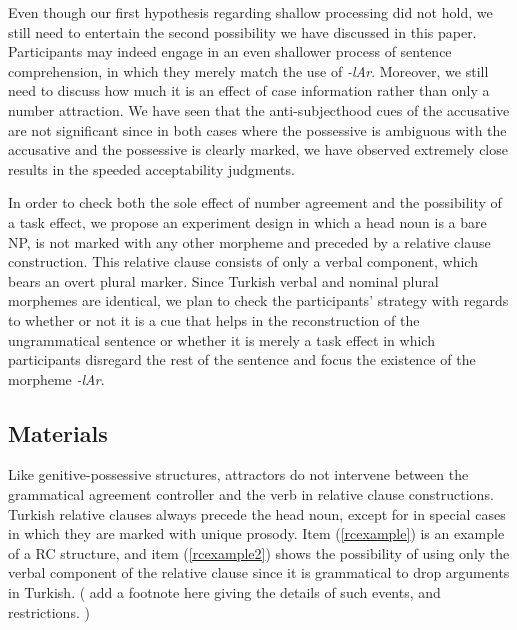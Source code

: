 \documentclass[doc]{apa6}
\begin{document}
Even though our first hypothesis regarding shallow processing did not
hold, we still need to entertain the second possibility we have
discussed in this paper. Participants may indeed engage in an even
shallower process of sentence comprehension, in which they merely match
the use of \emph{-lAr}. Moreover, we still need to discuss how much it
is an effect of case information rather than only a number attraction.
We have seen that the anti-subjecthood cues of the accusative are not
significant since in both cases where the possessive is ambiguous with
the accusative and the possessive is clearly marked, we have observed
extremely close results in the speeded acceptability judgments.

In order to check both the sole effect of number agreement and the
possibility of a task effect, we propose an experiment design in which a
head noun is a bare NP, is not marked with any other morpheme and
preceded by a relative clause construction. This relative clause
consists of only a verbal component, which bears an overt plural marker.
Since Turkish verbal and nominal plural morphemes are identical, we plan
to check the participants' strategy with regards to whether or not it is
a cue that helps in the reconstruction of the ungrammatical sentence or
whether it is merely a task effect in which participants disregard the
rest of the sentence and focus the existence of the morpheme
\emph{-lAr}.

\subsection{Materials}\label{materials}

Like genitive-possessive structures, attractors do not intervene between
the grammatical agreement controller and the verb in relative clause
constructions. Turkish relative clauses always precede the head noun,
except for in special cases in which they are marked with unique
prosody. Item (\ref{rcexample}) is an example of a RC structure, and
item (\ref{rcexample2}) shows the possibility of using only the verbal
component of the relative clause since it is grammatical to drop
arguments in Turkish. ( add a footnote here giving the details of such
events, and restrictions. )
\end{document}
